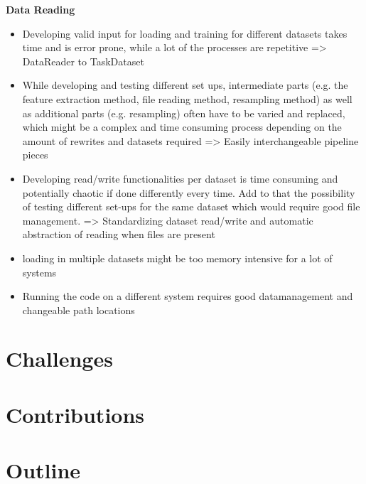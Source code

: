 \textbf{Data Reading}
\begin{itemize}
	\item Developing valid input for loading and training for different datasets takes time and is error prone, while a lot of the processes are repetitive => DataReader to TaskDataset
	\item While developing and testing different set ups, intermediate parts (e.g. the feature extraction method, file reading method, resampling method) as well as additional parts (e.g. resampling) often have to be varied and replaced, which might be a complex and time consuming process depending on the amount of rewrites and datasets required => Easily interchangeable pipeline pieces
	\item Developing read/write functionalities per dataset is time consuming and potentially chaotic if done differently every time. Add to that the possibility of testing different set-ups for the same dataset which would require good file management. => Standardizing dataset read/write and automatic abstraction of reading when files are present
	\item loading in multiple datasets might be too memory intensive for a lot of systems 
	\item Running the code on a different system requires good datamanagement and changeable path locations
\end{itemize}

\section{Challenges}

\section{Contributions}

\section{Outline}
